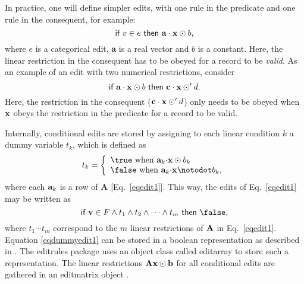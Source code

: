 \documentclass[11pt,fleqn,a4paper]{article}
\begin{document}
In practice, one will define simpler edits, with one rule in the predicate and one
rule in the consequent, for example:
\begin{equation}
\textrm{\sf if } v\in e \textrm{ \sf then } {\bf a}\cdot{\bf x}\odot b,
\end{equation}
where $e$ is a categorical edit, {\bf a} is a real vector and $b$ is a
constant.  Here, the linear restriction in the consequent has to be obeyed for
a record to be {\em valid}. As an example of an edit with two numerical
restrictions, consider
\begin{equation}
\textrm{\sf if } {\bf a}\cdot {\bf x} \odot b \textrm{ \sf then } {\bf c}\cdot{\bf x} \odot' d.
\end{equation}
Here, the restriction in the consequent ($ {\bf c}\cdot{\bf x} \odot' d$) only
needs to be obeyed when ${\bf x}$ obeys the restriction in the predicate for a record to
be valid.


Internally, conditional edits are stored by assigning to each
linear condition $k$ a dummy variable $t_k$, which is defined as
\begin{equation}
\label{eqdummy}
t_k = \left\{\begin{array}{l}
\true\textrm{ when } {\bf a}_k{\bf \cdot x}\odot b_k\\
\false\textrm{ when }{\bf a}_k{\bf \cdot x}\notodot b_k,
\end{array}\right.
\end{equation}
where each ${\bf a}_k$ is a row of {\bf A} [Eq.\ \eqref{eqedit1}].
This way, the edits of Eq.\ \eqref{eqedit1} may be written as
\begin{equation}
\label{eqdummyedit1}
\textrm{\sf if } {\bf v} \in F \land t_1\land t_2\land\cdots\land t_m \textrm{ \sf then \false},
\end{equation}
where $t_1\cdots t_m$ correspond to the $m$ linear restrictions of $\bf A$ in
Eq.\ \eqref{eqedit1}.  Equation \eqref{eqdummyedit1} can be stored in a boolean
representation as described in \cite{loo:2011b}. The {\sf editrules} package
uses an object class called {\sf editarray} to store such a representation.
The linear restrictions $\bf Ax \odot b$ for all conditional edits are gathered
in an {\sf editmatrix} object \citep{jonge:2011}. 
\end{document}
